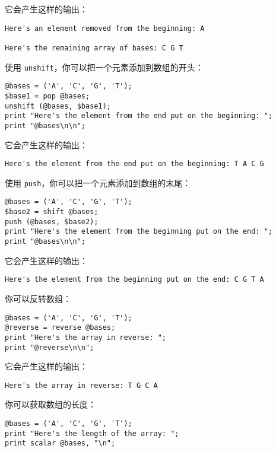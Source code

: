 它会产生这样的输出：

\begin{lstlisting}
Here's an element removed from the beginning: A

Here's the remaining array of bases: C G T
\end{lstlisting}

使用 \verb|unshift|，你可以把一个元素添加到数组的开头：

\begin{lstlisting}
@bases = ('A', 'C', 'G', 'T');
$base1 = pop @bases;
unshift (@bases, $base1);
print "Here's the element from the end put on the beginning: ";
print "@bases\n\n";
\end{lstlisting}

它会产生这样的输出：

\begin{lstlisting}
Here's the element from the end put on the beginning: T A C G
\end{lstlisting}

使用 \verb|push|，你可以把一个元素添加到数组的末尾：

\begin{lstlisting}
@bases = ('A', 'C', 'G', 'T');
$base2 = shift @bases;
push (@bases, $base2);
print "Here's the element from the beginning put on the end: ";
print "@bases\n\n";
\end{lstlisting}

它会产生这样的输出：

\begin{lstlisting}
Here's the element from the beginning put on the end: C G T A
\end{lstlisting}

你可以反转数组：

\begin{lstlisting}
@bases = ('A', 'C', 'G', 'T');
@reverse = reverse @bases;
print "Here's the array in reverse: ";
print "@reverse\n\n";
\end{lstlisting}

它会产生这样的输出：

\begin{lstlisting}
Here's the array in reverse: T G C A
\end{lstlisting}

你可以获取数组的长度：

\begin{lstlisting}
@bases = ('A', 'C', 'G', 'T');
print "Here's the length of the array: ";
print scalar @bases, "\n";
\end{lstlisting}

